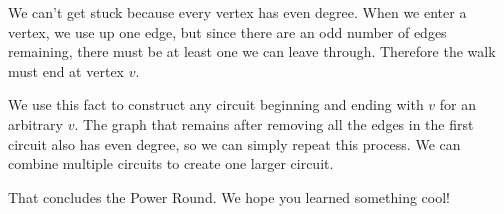 \documentclass[11pt]{article}
\begin{document}
\begin{solution}
We can't get stuck because every vertex has even degree. When we enter a vertex, we use up one edge, but since there are an odd number of edges remaining,
there must be at least one we can leave through. Therefore the walk must end at vertex $v$.

We use this fact to construct any circuit beginning and ending with $v$ for an arbitrary $v$. The graph that remains after removing all the edges in the first circuit
also has even degree, so we can simply repeat this process. We can combine multiple circuits to create one larger circuit.
\end{solution}

That concludes the Power Round. We hope you learned something cool!
\end{document}
